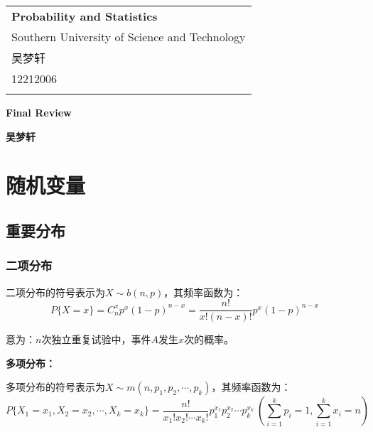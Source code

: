 \documentclass[a4paper,12pt]{ctexart}
\begin{document}
\thispagestyle{empty} %

\begin{tabular}{p{15.5cm}}
{\large \bf Probability and Statistics} \\
Southern University of Science and Technology \\ 吴梦轩 \\ 12212006 \\
\hline
\\
\end{tabular}

\vspace*{0.3cm} %

\begin{center}
	{\Large \bf Final Review}
	\vspace{2mm}

	{\bf 吴梦轩}
		
\end{center}  

\vspace{0.4cm}

\section{随机变量}

\subsection{重要分布}

\subsubsection{二项分布}

二项分布的符号表示为$X\sim b(n,p)$，其频率函数为：
\begin{equation*}
	P\{X = x\} = C_n^xp^x(1-p)^{n-x} = \frac{n!}{x!(n-x)!}p^x(1-p)^{n-x}
\end{equation*}

意为：$n$次独立重复试验中，事件$A$发生$x$次的概率。

\textbf{多项分布：}

多项分布的符号表示为$X\sim m(n,p_1,p_2,\cdots,p_k)$，其频率函数为：
\begin{equation*}
	P\{X_1 = x_1,X_2 = x_2,\cdots,X_k = x_k\} = \frac{n!}{x_1!x_2!\cdots x_k!}p_1^{x_1}p_2^{x_2}\cdots p_k^{x_k}\ \left(\sum_{i=1}^kp_i = 1, \sum_{i=1}^kx_i = n\right)
\end{equation*}
\end{document}
